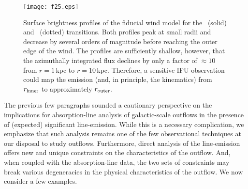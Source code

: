 \documentclass[]{emulateapj}
\begin{document}

\begin{figure}
\texttt{[image: f25.eps]}
\caption{
Surface brightness profiles of the fiducial wind model for the \mgiia\
(solid) and \feiie\ (dotted) transitions.  Both profiles peak at small
radii and decrease by several orders of magnitude before reaching the
outer edge of the wind.  The profiles are sufficiently shallow,
however, that the azimuthally integrated flux declines by only a
factor of $\approx 10$ from $r = 1$\,kpc to $r=10$\,kpc.  Therefore, a
sensitive IFU observation could map the emission (and, in principle,
the kinematics) from $r_{\rm inner}$ to approximately $r_{\rm outer}$.
}
\label{fig:obs_sb}
\end{figure}


The previous few paragraphs sounded a cautionary 
perspective on the implications for absorption-line analysis of
galactic-scale outflows in the presence of (expected) significant
line-emission.   While this is a necessary complication, 
we emphasize that such analysis remains one of the few observational
techniques at our disposal to study outflows.  Furthermore,
direct analysis of
the line-emission offers new and unique
constraints on the characteristics of the outflow.  And, when coupled
with the absorption-line data, the two sets of constraints may break
various degeneracies in the physical characteristics of the outflow.
We now consider a few examples.
\end{document}
